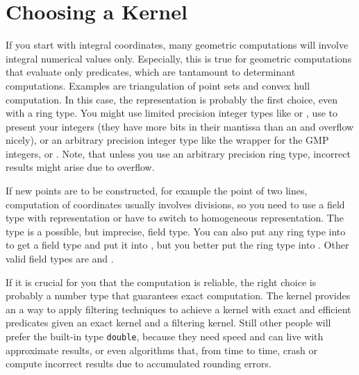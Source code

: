 \section{Choosing a Kernel}
If you start with integral  coordinates, many 
geometric computations will involve integral numerical values only. Especially, 
this is true for geometric computations that evaluate only predicates, which 
are tantamount to determinant computations. Examples are triangulation of 
point sets and convex hull computation.  In this case, the 
 representation is probably the first choice, 
even with a ring type. You might use limited precision integer types like
 or , use  to present your integers (they
have more bits in their mantissa than an  and overflow nicely), or an 
arbitrary precision integer type like the wrapper  for the
GMP integers,  or . Note, that unless you use
an arbitrary precision ring type, incorrect results might arise due to
overflow. 

If new points are to be constructed, for example
the  point of two lines, computation of 
 coordinates usually involves divisions, so
you need to use a field type with  representation
or have to switch to homogeneous representation. 
The type  is a possible, but imprecise, field type.
You can also put any ring type into  to get a
field type and put it into , but you better put
the ring type into .
Other valid field types are  and .

If it is crucial for you that the computation is reliable, 
the right choice is probably a number type that guarantees
exact computation. The kernel 
provides an a way to apply filtering techniques
\cite{bbp-iayea-98} to achieve a kernel with exact and efficient predicates
given an exact kernel and a filtering kernel.
Still other people will prefer the built-in
type {\tt double}, because they need speed and can live with
approximate results, or even algorithms that, from time to time,
crash or compute incorrect results due to accumulated rounding errors.
